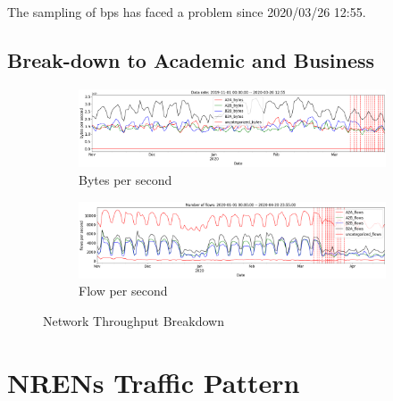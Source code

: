 \documentclass[10pt, journal, letterpaper]{IEEEtran}
\begin{document}
The sampling of bps has faced a problem since 2020/03/26 12:55. 

\subsection{Break-down to Academic and Business}

\begin{figure}
    \begin{subfigure}{\textwidth}
          \centering
          \includegraphics[width=\columnwidth]{img/traffic_trend_bps_AcaVsBus.png}
          \caption{Bytes per second}
          \label{fig:traffic_trend_acaVSbusi_bps}
    \end{subfigure}
    \begin{subfigure}{\textwidth}
          \centering
          \includegraphics[width=\columnwidth]{img/traffic_trend_fps_AcaVsBus.png}
          \caption{Flow per second}
          \label{fig:traffic_trend_acaVSbusi_fps}
    \end{subfigure}
    \caption{Network Throughput Breakdown}
    \label{fig:network_throughput_breakdown}
\end{figure}

\section{NRENs Traffic Pattern}
\end{document}
